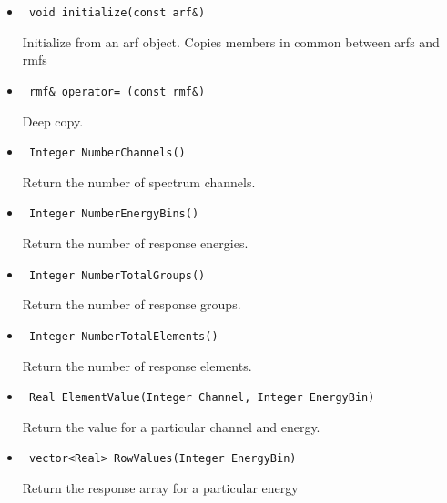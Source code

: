 \documentclass[11pt]{book}
\begin{document}
\begin{itemize}
\item  \begin{verbatim} void initialize(const arf&) \end{verbatim}

          Initialize from an arf object. Copies members in common between arfs and rmfs

\item  \begin{verbatim} rmf& operator= (const rmf&) \end{verbatim}  

          Deep copy.

\item  \begin{verbatim} Integer NumberChannels() \end{verbatim}

          Return the number of spectrum channels.

\item  \begin{verbatim} Integer NumberEnergyBins() \end{verbatim}
  
          Return the number of response energies. 

\item  \begin{verbatim} Integer NumberTotalGroups() \end{verbatim}
  
          Return the number of response groups. 

\item  \begin{verbatim} Integer NumberTotalElements() \end{verbatim}
  
          Return the number of response elements. 

\item  \begin{verbatim} Real ElementValue(Integer Channel, Integer EnergyBin) \end{verbatim}

          Return the value for a particular channel and energy.

\item  \begin{verbatim} vector<Real> RowValues(Integer EnergyBin) \end{verbatim}

          Return the response array for a particular energy


\end{itemize}
\end{document}
